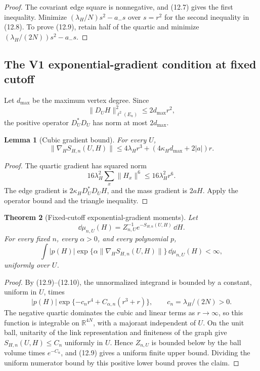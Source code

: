 \documentclass[11pt]{article}
\newtheorem{theorem}{Theorem}[section]
\newtheorem{lemma}[theorem]{Lemma}
\theoremstyle{remark}
\begin{document}
\begin{proof}
The covariant edge square is nonnegative, and (12.7) gives the
first inequality.  Minimize
\((\lambda_H/N)s^2-a_-s\) over \(s=r^2\) for the second inequality
in (12.8).  To prove (12.9), retain half of the quartic and minimize
\((\lambda_H/(2N))s^2-a_-s\).
\end{proof}

\subsection{The V1 exponential-gradient condition at fixed cutoff}

Let \(d_{\max}\) be the maximum vertex degree.  Since
\[
 \|D_UH\|_{\ell^2(E_n)}^2\leq2d_{\max}r^2,
\]
the positive operator \(D_U^*D_U\) has norm at most
\(2d_{\max}\).

\begin{lemma}[Cubic gradient bound]
\label{lem:v17v12-gradient}
For every \(U\),
\[
 \|\nabla_HS_{H,n}(U,H)\|
 \leq
 4\lambda_Hr^3+
 (4\kappa_Hd_{\max}+2|a|)r.                       \tag{12.10}
\]
\end{lemma}

\begin{proof}
The quartic gradient has squared norm
\[
 16\lambda_H^2\sum_x\|H_x\|^6
 \leq16\lambda_H^2r^6.
\]
The edge gradient is \(2\kappa_HD_U^*D_UH\), and the mass gradient
is \(2aH\).  Apply the operator bound and the triangle inequality.
\end{proof}

\begin{theorem}[Fixed-cutoff exponential-gradient moments]
\label{thm:v17v12-exp-gradient}
Let
\[
 \dd\mu_{n,U}(H)=Z_{n,U}^{-1}e^{-S_{H,n}(U,H)}\,\dd H.
\]
For every fixed \(n\), every \(\alpha>0\), and every polynomial
\(p\),
\[
 \int |p(H)|
 \exp\{\alpha\|\nabla_HS_{H,n}(U,H)\|\}
 \,\dd\mu_{n,U}(H)<\infty,                         \tag{12.11}
\]
uniformly over \(U\).
\end{theorem}

\begin{proof}
By (12.9)--(12.10), the unnormalized integrand is bounded by a
constant, uniform in \(U\), times
\[
 |p(H)|\exp\{-c_nr^4+C_{\alpha,n}(r^3+r)\},
 \qquad c_n=\lambda_H/(2N)>0.
\]
The negative quartic dominates the cubic and linear terms as
\(r\to\infty\), so this function is integrable on
\(\mathbb R^{4N}\), with a majorant independent of \(U\).  On the
unit ball, unitarity of the link representation and finiteness of the
graph give \(S_{H,n}(U,H)\leq C_n\) uniformly in \(U\).  Hence
\(Z_{n,U}\) is bounded below by the ball volume times \(e^{-C_n}\),
and (12.9) gives a uniform finite upper bound.  Dividing the
uniform numerator bound by this positive lower bound proves the claim.
\end{proof}
\end{document}
